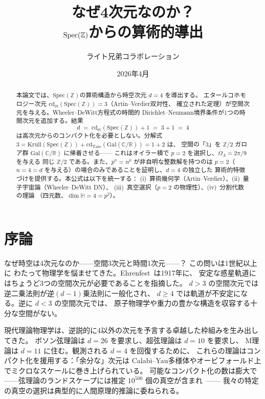 \documentclass[12pt,a4paper]{article}
\title{\textbf{なぜ4次元なのか？\\$\Spec(\ZZ)$からの算術的導出}}
\author{ライト兄弟コラボレーション}
\date{2026年4月}
\theoremstyle{definition}
\newcommand{\Spec}{\mathrm{Spec}}
\newcommand{\Gal}{\mathrm{Gal}}
\newcommand{\cd}{\mathrm{cd}}
\newcommand{\Krull}{\mathrm{Krull}}
\newcommand{\ZZ}{\mathbb{Z}}
\newcommand{\RR}{\mathbb{R}}
\newcommand{\CC}{\mathbb{C}}
\newcommand{\HH}{\mathbb{H}}
\begin{document}
\maketitle

\begin{abstract}
本論文では、$\Spec(\ZZ)$の算術構造から時空次元 $d=4$ を導出する。
エタールコホモロジー次元 $\cd_{\text{\'et}}(\Spec(\ZZ)) = 3$（Artin--Verdier双対性、
確立された定理）が空間次元を与える。Wheeler--DeWitt方程式の時間的
Dirichlet--Neumann境界条件が1つの時間次元を追加する。結果
\[
  d \;=\; \cd_{\text{\'et}}(\Spec(\ZZ)) + 1 \;=\; 3 + 1 \;=\; 4
\]
は高次元からのコンパクト化を必要としない。分解式
$3 = \Krull(\Spec(\ZZ)) + \cd_{\mathrm{Tate}}(\Gal(\CC/\RR)) = 1 + 2$ は、
空間の「3」を $\ZZ/2$ ガロア群 $\Gal(\CC/\RR)$ に帰着させる——
これはオイラー積で $p=2$ を選択し、$\Omega_\Lambda = 2\pi/9$ を与える
同じ $\ZZ/2$ である。また、$p^n = n^p$ が非自明な整数解を持つのは
$p=2$（$n=4=d$ を与える）の場合のみであることを証明し、$d=4$ の独立した
算術的特徴づけを提供する。本公式は以下を統一する：
(i)~算術幾何学（Artin--Verdier）、(ii)~量子宇宙論（Wheeler--DeWitt DN）、
(iii)~真空選択（$p=2$ の物理性）、(iv)~分割代数の理論
（四元数、$\dim \HH = 4 = p^2$）。
\end{abstract}

\tableofcontents

\section{序論}\label{sec:intro}

なぜ時空は4次元なのか——空間3次元と時間1次元——？ この問いは1世紀以上に
わたって物理学を悩ませてきた。Ehrenfest~\cite{Ehrenfest1917}は1917年に、
安定な惑星軌道にはちょうど3つの空間次元が必要であることを指摘した。
$d>3$ の空間次元では逆二乗法則が逆$(d-1)$乗法則に一般化され、
$d \geq 4$ では軌道が不安定になる。逆に $d < 3$ の空間次元では、
原子物理学や重力の豊かな構造を収容する十分な空間がない。

現代理論物理学は、逆説的に4以外の次元を予言する卓越した枠組みを生み出してきた。
ボソン弦理論は $d=26$ を要求し、超弦理論は $d=10$ を要求し、
M理論は $d=11$ に住む。観測される $d=4$ を回復するために、
これらの理論はコンパクト化を援用する：「余分な」次元は
Calabi--Yau多様体やオービフォールド上でミクロなスケールに巻き上げられている。
可能なコンパクト化の数は膨大で——弦理論のランドスケープには推定
$10^{500}$ 個の真空が含まれ~\cite{Bousso2000,KKLT2003}——
我々の特定の真空の選択は典型的に人間原理的推論に委ねられる。
\end{document}

